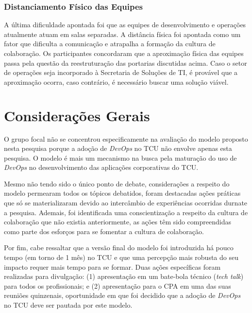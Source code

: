 \subsubsection{Distanciamento Físico das Equipes}

A última dificuldade apontada foi que as equipes de desenvolvimento e operações
atualmente atuam em salas separadas. A distância física foi apontada como um fator
que dificulta a comunicação e atrapalha a formação da cultura de colaboração.
Os participantes concordaram que a aproximação física das equipes passa pela
questão da reestruturação das portarias discutidas acima. Caso o setor de
operações seja incorporado à Secretaria de Soluções de \acrshort{TI}, é provável
que a aproximação ocorra, caso contrário, é necessário buscar uma solução
viável.

\section{Considerações Gerais}

O grupo focal não se concentrou especificamente na avaliação do modelo proposto
nesta pesquisa porque a adoção de {\it DevOps} no \acrshort{TCU} não envolve
apenas esta pesquisa. O modelo é mais um mecanismo na busca pela maturação do
uso de {\it DevOps} no desenvolvimento das aplicações corporativas do \acrshort{TCU}.

Mesmo não tendo sido o único ponto de debate, considerações a respeito do modelo
permearam todos os tópicos debatidos, foram destacadas ações práticas que só
se materializaram devido ao intercâmbio de experiências ocorridas durnate a
pesquisa. Ademais, foi identificada uma conscientização a respeito da cultura
de colaboração que não existia anteriormente, as ações têm sido compreendidas
como parte dos esforços para se fomentar a cultura de colaboração.

Por fim, cabe ressaltar que a versão final do modelo foi introduzida há pouco
tempo (em torno de 1 mês) no \acrshort{TCU} e que uma percepção mais robusta
do seu impacto requer mais tempo para se formar. Duas ações específicas foram
realizadas para divulgação: (1) apresentação em um bate-bola técnico ({\it tech
talk}) para todos os profissionais; e (2) apresentação para o \acrfull{CPA} em
uma das suas reuniões quinzenais, oportunidade em que foi decidido que a
adoção de {\it DevOps} no \acrshort{TCU} deve ser pautada por este modelo.
